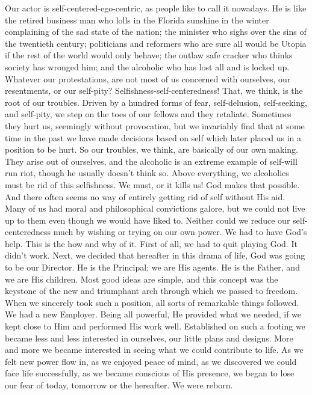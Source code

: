 \begin{biblechapter}
Our actor is self-centered-ego-centric, as people like to call it nowadays.  He is like the retired business man who lolls in the Florida sunshine in the winter complaining of the sad state of the nation; the minister who sighs over the sins of the twentieth century; politicians and reformers who are sure all would be Utopia if the rest of the world would only behave; the outlaw safe cracker who thinks society has wronged him; and the alcoholic who has lost all and is locked up.  Whatever our protestations, are not most of us concerned with ourselves, our resentments, or our self-pity?
Selfishness-self-centeredness!  That, we think, is the root of our troubles.  Driven by a hundred forms of fear, self-delusion, self-seeking, and self-pity, we step on the toes of our fellows and they retaliate.  Sometimes they hurt us, seemingly without provocation, but we invariably find that at some time in the past we have made decisions based on self which later placed us in a position to be hurt.
So our troubles, we think, are basically of our own making.  They arise out of ourselves, and the alcoholic is an extreme example of self-will run riot, though he usually doesn't think so.  Above everything, we alcoholics must be rid of this selfishness.  We must, or it kills us!  God makes that possible.  And there often seems no way of entirely getting rid of self without His aid.  Many of us had moral and philosophical convictions galore, but we could not live up to them even though we would have liked to.  Neither could we reduce our self-centeredness much by wishing or trying on our own power.  We had to have God's help.
This is the how and why of it.  First of all, we had to quit playing God.  It didn't work.  Next, we decided that hereafter in this drama of life, God was going to be our Director.  He is the Principal; we are His agents.  He is the Father, and we are His children.  Most good ideas are simple, and this concept was the keystone of the new and triumphant arch through which we passed to freedom.
When we sincerely took such a position, all sorts of remarkable things followed.  We had a new Employer.  Being all powerful, He provided what we needed, if we kept close to Him and performed His work well.  Established on such a footing we became less and less interested in ourselves, our little plans and designs.  More and more we became interested in seeing what we could contribute to life.  As we felt new power flow in, as we enjoyed peace of mind, as we discovered we could face life successfully, as we became conscious of His presence, we began to lose our fear of today, tomorrow or the hereafter.  We were reborn.

\end{biblechapter}
